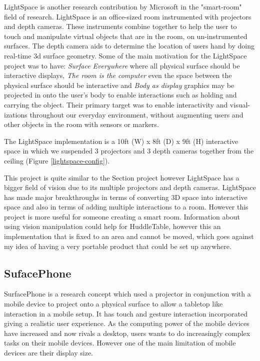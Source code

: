 LightSpace is another research contribution by Microsoft in the "smart-room" field of research\cite{lightspace}. LightSpace is an office-sized room instrumented with projectors and depth cameras. These instruments combine together to help the user to touch and manipulate virtual objects that are in the room, on un-instrumented surfaces. The depth camera aids to determine the location of users hand by doing real-time 3d surface geometry. Some of the main motivation for the LightSpace project was to have: 
\emph{Surface Everywhere} where all physical surface should be interactive displays, 
\emph{The room is the computer} even the space between the physical surface should be interactive and 
\emph{Body as display} graphics may be projected in onto the user's body to enable interactions such as holding and carrying the object.
Their primary target was to enable interactivity and visual- izations throughout our everyday environment, without augmenting users and other objects in the room with sensors or markers\cite{lightspace}.

The LightSpace implementation is  a 10ft (W) x 8ft (D) x 9ft (H) interactive space in which we suspended 3 projectors and 3 depth cameras together from the ceiling (Figure \ref{lightspace-config})\cite{lightspace}.

This project is quite similar to the Section  project however LightSpace has a bigger field of vision due to its multiple projectors and depth cameras. LightSpace has made major breakthroughs in terms of converting 3D space into interactive space and also in terms of adding multiple interactions to a room. However this project is more useful for someone creating a smart room. Information about using vision manipulation could help for HuddleTable, however this an implementation that is fixed to an area and cannot be moved, which goes against my idea of having a very portable product that could be set up anywhere. 

\subsection{SufacePhone}

SurfacePhone\cite{surfacephone} is a research concept which used
a projector in conjunction with a mobile device to project onto a
physical surface to allow a tabletop like interaction in a mobile setup.
It has touch and gesture interaction incorporated giving a
realistic user experience. As the computing power of the mobile devices have
increased and now rivals a desktop, users wants to do increasingly complex
tasks on their mobile devices. However one of the main limitation
of mobile devices are their display size. 

